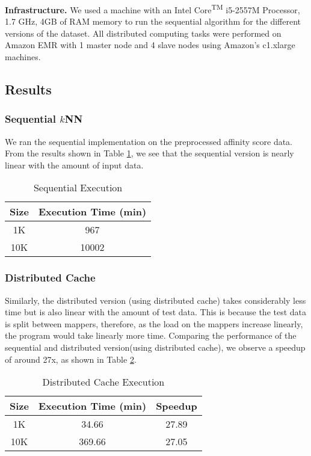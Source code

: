 \documentclass[conference, 12pt]{IEEEtran}
\begin{document}
\textbf{Infrastructure.} We used a machine with an Intel Core\textsuperscript{TM} i5-2557M Processor, 1.7 GHz, 4GB of RAM memory to run the sequential algorithm for the different versions of the dataset. All distributed computing tasks were performed on Amazon EMR with 1 master node and 4 slave nodes using Amazon’s c1.xlarge machines.

\subsection{Results}

\subsubsection{Sequential $k$NN}
We ran the sequential implementation on the preprocessed affinity score data. From the results shown in Table \ref{tb:sequential}, we see that the sequential version is nearly linear with the amount of input data. 

\begin{table}[h!]
\begin{center}
\begin{tabular}{|c|c|}
\hline
{\bf Size} & {\bf Execution Time (min)} \\
\hline
\hline
1K   & 967  \\
\hline
10K   & 10002   \\
\hline

\end{tabular}
\caption{Sequential Execution}
\label{tb:sequential}
\end{center}
\end{table}


\subsubsection{Distributed Cache}
Similarly, the distributed version (using distributed cache) takes considerably less time but is also linear with the amount of test data. This is because the test data is split between mappers, therefore, as the load on the mappers increase linearly, the program would take linearly more time. Comparing the performance of the sequential and distributed version(using distributed cache), we observe a speedup of around 27x, as shown in Table \ref{tb:distributed}. 
 
\begin{table}[h!]
\begin{center}
\begin{tabular}{|c|c|c|}
\hline
{\bf Size} & {\bf Execution Time (min)} & {\bf Speedup}\\
\hline
\hline
1K   & 34.66  & 27.89 \\
\hline
10K   & 369.66 & 27.05 \\
\hline

\end{tabular}
\caption{Distributed Cache Execution}
\label{tb:distributed}
\end{center}
\end{table}
\end{document}
